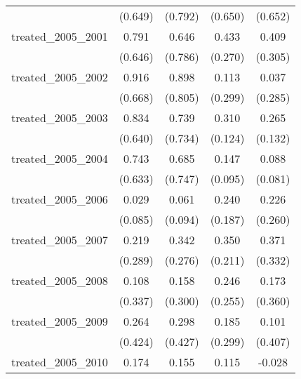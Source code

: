{\begin{tabular}{l*{4}{c}}
            &     (0.649)         &     (0.792)         &     (0.650)         &     (0.652)         \\
[1em]
treated\_2005\_2001&       0.791         &       0.646         &       0.433         &       0.409         \\
            &     (0.646)         &     (0.786)         &     (0.270)         &     (0.305)         \\
[1em]
treated\_2005\_2002&       0.916         &       0.898         &       0.113         &       0.037         \\
            &     (0.668)         &     (0.805)         &     (0.299)         &     (0.285)         \\
[1em]
treated\_2005\_2003&       0.834         &       0.739         &       0.310\sym{*}  &       0.265\sym{*}  \\
            &     (0.640)         &     (0.734)         &     (0.124)         &     (0.132)         \\
[1em]
treated\_2005\_2004&       0.743         &       0.685         &       0.147         &       0.088         \\
            &     (0.633)         &     (0.747)         &     (0.095)         &     (0.081)         \\
[1em]
treated\_2005\_2006&       0.029         &       0.061         &       0.240         &       0.226         \\
            &     (0.085)         &     (0.094)         &     (0.187)         &     (0.260)         \\
[1em]
treated\_2005\_2007&       0.219         &       0.342         &       0.350         &       0.371         \\
            &     (0.289)         &     (0.276)         &     (0.211)         &     (0.332)         \\
[1em]
treated\_2005\_2008&       0.108         &       0.158         &       0.246         &       0.173         \\
            &     (0.337)         &     (0.300)         &     (0.255)         &     (0.360)         \\
[1em]
treated\_2005\_2009&       0.264         &       0.298         &       0.185         &       0.101         \\
            &     (0.424)         &     (0.427)         &     (0.299)         &     (0.407)         \\
[1em]
treated\_2005\_2010&       0.174         &       0.155         &       0.115         &      -0.028         \\

\end{tabular}}
